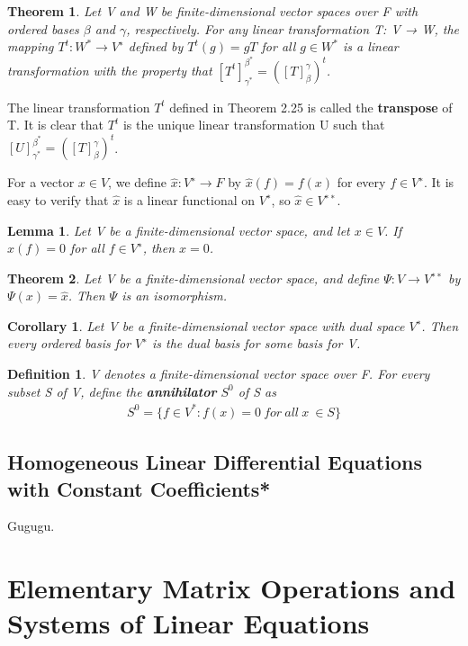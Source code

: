 \documentclass{article}
\newcommand{\bd}[1]{\textbf{#1}}
\theoremstyle{plain}
\newtheorem{theorem}{Theorem}[section]
\newtheorem*{lemma}{Lemma}
\newtheorem*{corollary}{Corollary}
\newtheorem*{definition1}{Definition}
\theoremstyle{plain} %
\begin{document}
\begin{theorem}
Let V and W be finite-dimensional vector spaces over F with ordered bases $\beta$ and $\gamma$, respectively. For any linear transformation T: V → W, the mapping $T^t : W^* \to V^∗$ defined by $T^t(g) = gT$ for all $g\in W^*$ is a linear transformation with the property that $[T^t]_{\gamma^*}^{\beta^*}={([T]_\beta^\gamma)}^t$.
\end{theorem}

The linear transformation $T^t$ defined in Theorem 2.25 is called the \bd{transpose} of T. It is clear that $T^t$ is the unique linear transformation U such that $[U]_{\gamma^*}^{\beta^*}=([T]_\beta^\gamma)^t$.

For a vector $x \in V$, we define $\hat{x}: V^∗ \to F$ by $\hat{x}(f) = f(x)$ for every $f \in V^∗$. It is easy to verify that $\hat{x}$ is a linear functional on $V^∗$, so $\hat{x} \in V^{∗∗}$.

\begin{lemma}
Let V be a finite-dimensional vector space, and let $x \in V$. If $\hat{x}(f)=0$ for all $f \in V^∗$, then $x = 0$.
\end{lemma}

\begin{theorem}
Let V be a finite-dimensional vector space, and define $\Psi: V \to V^{∗∗}$ by $\Psi(x) = \hat{x}$. Then $\Psi$ is an isomorphism.
\end{theorem}

\begin{corollary}
Let V be a finite-dimensional vector space with dual space $V^∗$. Then every ordered basis for $V^∗$ is the dual basis for some basis for V.
\end{corollary}

\begin{definition1}
V denotes a finite-dimensional vector space over F. For every subset S of V, define the \bd{annihilator} $S^0$ of S as
\begin{align*}
S^0 = \{ f \in V^* : f(x) = 0~for~all~x~\in S\}
\end{align*}
\end{definition1}

\subsection{Homogeneous Linear Differential Equations with Constant Coefficients*}

Gugugu.

\section {Elementary Matrix Operations and Systems of Linear Equations}
\end{document}
